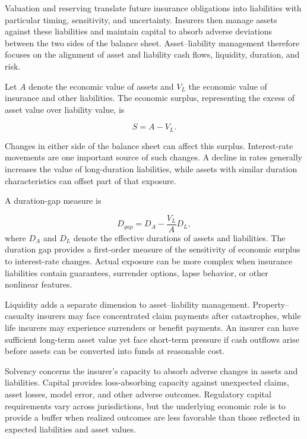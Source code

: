 Valuation and reserving translate future insurance obligations into liabilities with particular timing, sensitivity, and uncertainty. Insurers then manage assets against these liabilities and maintain capital to absorb adverse deviations between the two sides of the balance sheet. Asset--liability management therefore focuses on the alignment of asset and liability cash flows, liquidity, duration, and risk.

Let $A$ denote the economic value of assets and $V_L$ the
economic value of insurance and other liabilities. The
economic surplus, representing the excess of asset value
over liability value, is

\begin{equation}
S=A-V_L.
\label{eq:ch15-economic-surplus}
\end{equation}

Changes in either side of the balance sheet can affect this surplus. Interest-rate movements are one important source of such changes. A decline in rates generally increases the value of long-duration liabilities, while assets with similar duration characteristics can offset part of that exposure.

A duration-gap measure is

\begin{equation}
D_{gap}=D_A-\frac{V_L}{A}D_L,
\label{eq:ch15-insurer-duration-gap}
\end{equation}
where $D_A$ and $D_L$ denote the effective durations of assets and liabilities. The duration gap provides a first-order measure of the sensitivity of economic surplus to interest-rate changes. Actual exposure can be more complex when insurance liabilities contain guarantees, surrender options, lapse behavior, or other nonlinear features.

Liquidity adds a separate dimension to asset--liability management. Property--casualty insurers may face concentrated claim payments after catastrophes, while life insurers may experience surrenders or benefit payments. An insurer can have sufficient long-term asset value yet face short-term pressure if cash outflows arise before assets can be converted into funds at reasonable cost.

Solvency concerns the insurer's capacity to absorb adverse changes in assets and liabilities. Capital provides loss-absorbing capacity against unexpected claims, asset losses, model error, and other adverse outcomes. Regulatory capital requirements vary across jurisdictions, but the underlying economic role is to provide a buffer when realized outcomes are less favorable than those reflected in expected liabilities and asset values.


